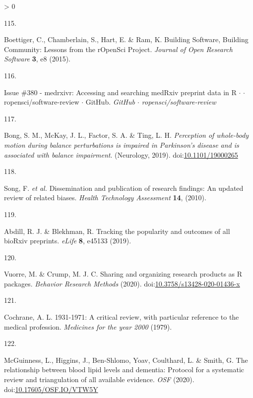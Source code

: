 \documentclass[a4paper, twoside]{templates/ociamthesis}
\newlength{\cslhangindent}
\newlength{\csllabelwidth}
\newenvironment{CSLReferences}[3] %
 {%
  \setlength{\parindent}{0pt}
  \ifodd #1 \everypar{\setlength{\hangindent}{\cslhangindent}}\ignorespaces\fi
  \ifnum #2 > 0
  \setlength{\parskip}{#2\baselineskip}
  \fi
 }%
 {}
\newcommand{\CSLLeftMargin}[1]{\parbox[t]{\maxof{\widthof{#1}}{\csllabelwidth}}{#1}}
\newcommand{\CSLRightInline}[1]{\parbox[t]{\linewidth - \csllabelwidth}{#1}}
\begin{document}
\begin{CSLReferences}{0}{0}
\leavevmode\hypertarget{ref-boettiger2015}{}%
\CSLLeftMargin{115. }
\CSLRightInline{Boettiger, C., Chamberlain, S., Hart, E. \& Ram, K. Building {Software}, {Building Community}: {Lessons} from the {rOpenSci Project}. \emph{Journal of Open Research Software} \textbf{3}, e8 (2015).}

\leavevmode\hypertarget{ref-zotero-15016}{}%
\CSLLeftMargin{116. }
\CSLRightInline{Issue \#380 - medrxivr: {Accessing} and searching {medRxiv} preprint data in {R} {\(\cdot\)} {\(\cdot\)} ropensci/software-review {\(\cdot\)} {GitHub}. \emph{GitHub {\(\cdot\)} ropensci/software-review}}

\leavevmode\hypertarget{ref-bong2019}{}%
\CSLLeftMargin{117. }
\CSLRightInline{Bong, S. M., McKay, J. L., Factor, S. A. \& Ting, L. H. \emph{Perception of whole-body motion during balance perturbations is impaired in {Parkinson}'s disease and is associated with balance impairment}. ({Neurology}, 2019). doi:\href{https://doi.org/10.1101/19000265}{10.1101/19000265}}

\leavevmode\hypertarget{ref-song2010}{}%
\CSLLeftMargin{118. }
\CSLRightInline{Song, F. \emph{et al.} Dissemination and publication of research findings: An updated review of related biases. \emph{Health Technology Assessment} \textbf{14}, (2010).}

\leavevmode\hypertarget{ref-abdill2019b}{}%
\CSLLeftMargin{119. }
\CSLRightInline{Abdill, R. J. \& Blekhman, R. Tracking the popularity and outcomes of all {bioRxiv} preprints. \emph{eLife} \textbf{8}, e45133 (2019).}

\leavevmode\hypertarget{ref-vuorre2020}{}%
\CSLLeftMargin{120. }
\CSLRightInline{Vuorre, M. \& Crump, M. J. C. Sharing and organizing research products as {R} packages. \emph{Behavior Research Methods} (2020). doi:\href{https://doi.org/10.3758/s13428-020-01436-x}{10.3758/s13428-020-01436-x}}

\leavevmode\hypertarget{ref-cochrane1979}{}%
\CSLLeftMargin{121. }
\CSLRightInline{Cochrane, A. L. 1931-1971: A critical review, with particular reference to the medical profession. \emph{Medicines for the year 2000} (1979).}

\leavevmode\hypertarget{ref-mcguinnessluke2020}{}%
\CSLLeftMargin{122. }
\CSLRightInline{McGuinness, L., Higgins, J., Ben-Shlomo, Yoav, Coulthard, L. \& Smith, G. The relationship between blood lipid levels and dementia: Protocol for a systematic review and triangulation of all available evidence. \emph{OSF} (2020). doi:\href{https://doi.org/10.17605/OSF.IO/VTW5Y}{10.17605/OSF.IO/VTW5Y}}


\end{CSLReferences}
\end{document}
